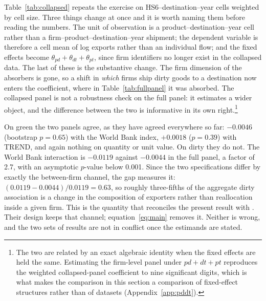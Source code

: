 \documentclass[12pt]{article}
\begin{document}
Table~\ref{tab:collapsed} repeats the exercise on HS6--destination--year cells weighted by cell size.
Three things change at once and it is worth naming them before reading the numbers. The unit of
observation is a product--destination--year cell rather than a firm--product--destination--year
shipment; the dependent variable is therefore a cell mean of log exports rather than an individual
flow; and the fixed effects become $\theta_{pd} + \theta_{dt} + \theta_{pt}$, since firm identifiers
no longer exist in the collapsed data. The last of these is the substantive change. The firm
dimension of the absorbers is gone, so a shift in \emph{which} firms ship dirty goods to a
destination now enters the coefficient, where in Table~\ref{tab:fullpanel} it was absorbed. The
collapsed panel is not a robustness check on the full panel: it estimates a wider object, and the
difference between the two is informative in its own right.\footnote{The two are related by an exact
algebraic identity when the fixed effects are held the same. Estimating the firm-level panel under
$pd + dt + pt$ reproduces the weighted collapsed-panel coefficient to nine significant digits, which
is what makes the comparison in this section a comparison of fixed-effect structures rather than of
datasets (Appendix~\ref{app:pddt}).}

On green the two panels agree, as they have agreed everywhere so far: $-0.0046$ (bootstrap
$p = 0.65$) with the World Bank index, $+0.0018$ ($p = 0.39$) with TREND, and again nothing on
quantity or unit value. On dirty they do not. The World Bank interaction is $-0.0119$ against
$-0.0044$ in the full panel, a factor of 2.7, with an asymptotic $p$-value below 0.001. Since the two
specifications differ by exactly the between-firm channel, the gap measures it:
$(0.0119 - 0.0044)/0.0119 = 0.63$, so roughly three-fifths of the aggregate dirty association is a
change in the composition of exporters rather than reallocation inside a given firm. This is the
quantity that reconciles the present result with \citet{zhusun2026}. Their design keeps that channel;
equation~\eqref{eq:main} removes it. Neither is wrong, and the two sets of results are not in conflict
once the estimands are stated.
\end{document}
